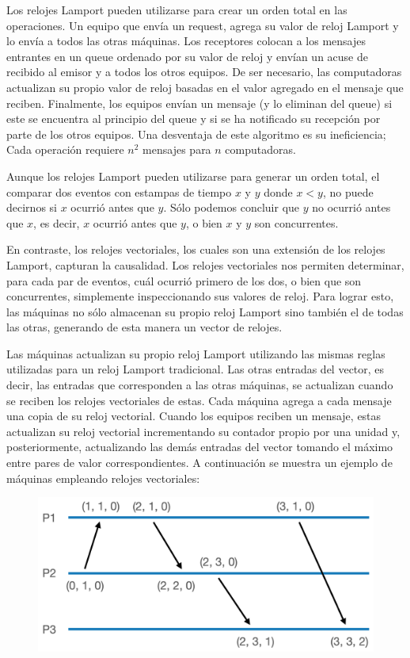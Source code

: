 \documentclass[12pt]{article}
\begin{document}
Los relojes Lamport pueden utilizarse para crear un orden total en las operaciones.
Un equipo que envía un request,
agrega su valor de reloj Lamport y lo envía a todos las otras máquinas.
Los receptores colocan a los mensajes entrantes en un queue ordenado por su valor de reloj y envían un acuse de recibido al emisor y a todos los otros equipos.
De ser necesario,
las computadoras actualizan su propio valor de reloj basadas en el valor agregado en el mensaje que reciben.
Finalmente,
los equipos envían un mensaje (y lo eliminan del queue) si este se encuentra al principio del queue y si se ha notificado su recepción por parte de los otros equipos.
Una desventaja de este algoritmo es su ineficiencia;
Cada operación requiere $n^2$ mensajes para $n$ computadoras.

Aunque los relojes Lamport pueden utilizarse para generar un orden total,
el comparar dos eventos con estampas de tiempo $x$ y $y$ donde $x < y$,
no puede decirnos si $x$ ocurrió antes que $y$.
Sólo podemos concluir que $y$ no ocurrió antes que $x$,
es decir,
$x$ ocurrió antes que $y$,
o bien $x$ y $y$ son concurrentes.

En contraste, los relojes vectoriales,
los cuales son una extensión de los relojes Lamport,
capturan la causalidad.
Los relojes vectoriales nos permiten determinar,
para cada par de eventos,
cuál ocurrió primero de los dos,
o bien que son concurrentes,
simplemente inspeccionando sus valores de reloj.
Para lograr esto,
las máquinas no sólo almacenan su propio reloj Lamport
sino también el de todas las otras,
generando de esta manera un vector de relojes.

Las máquinas actualizan su propio reloj Lamport utilizando las mismas reglas utilizadas para un reloj Lamport tradicional.
Las otras entradas del vector,
es decir,
las entradas que corresponden a las otras máquinas,
se actualizan cuando se reciben los relojes vectoriales de estas.
Cada máquina agrega a cada mensaje una copia de su reloj vectorial.
Cuando los equipos reciben un mensaje,
estas actualizan su reloj vectorial incrementando su contador propio por una unidad y,
posteriormente,
actualizando las demás entradas del vector tomando el máximo entre pares de valor correspondientes.
A continuación se muestra un ejemplo de máquinas empleando relojes vectoriales:

\begin{figure}[h]
   \centering
   \includegraphics[scale=0.3]{vector_clocks.png}
\end{figure}
\end{document}
